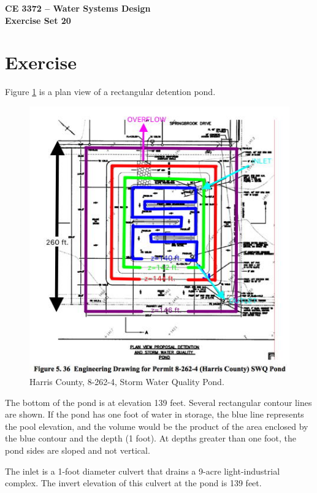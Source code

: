 \documentclass[12pt]{article}
\begin{document}
\begin{center}
{\textbf{{CE 3372 -- Water Systems Design} \\ {Exercise Set 20}}}
\end{center}

\section*{\small{Exercise}}
Figure \ref{fig:detention} is a plan view of a rectangular detention pond.   

\begin{figure}[h!] %
   \centering
   \includegraphics[width=6in]{detention.jpg} 
   \caption{Harris County, 8-262-4, Storm Water Quality Pond.}
   \label{fig:detention}
\end{figure}
\clearpage
The bottom of the pond is at elevation 139 feet.   
Several rectangular contour lines are shown.   
If the pond has one foot of water in storage, the blue line represents the pool elevation, and the volume would be the product of the area enclosed by the blue contour and the depth (1 foot).   
At depths greater than one foot, the pond sides are sloped and not vertical.

The inlet is a 1-foot diameter culvert that drains a 9-acre light-industrial complex.   
The invert elevation of this culvert at the pond is 139 feet.
\end{document}
